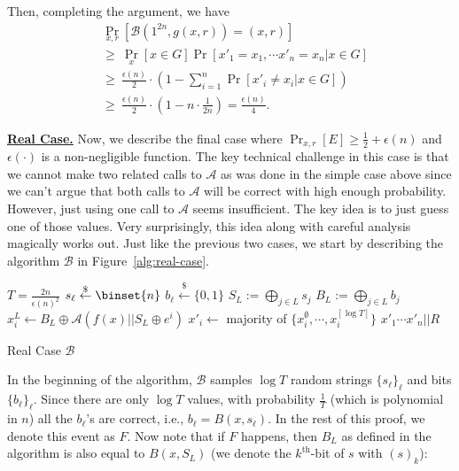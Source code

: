 \documentclass[12pt]{tufte-book}
\newcommand{\ma}{\mathcal{A}}
\begin{document}
Then, completing the argument, we have
\begin{align*}
&\Pr_{x,r}[\mathcal{B}(1^{2n}, g(x,r)) = (x,r)]\\
&\geq~ \Pr_x [x \in G] \Pr[x'_1 = x_1, \cdots x'_n = x_n | x \in G]\\
&\geq~ \frac{\epsilon(n)}{2} \cdot \left(1- \sum_{i=1}^n\Pr[x'_i \neq x_i | x \in G]\right)\\
&\geq~ \frac{\epsilon(n)}{2} \cdot \left(1- n \cdot\frac{1}{2n} \right) =  \frac{\epsilon(n)}{4}.
\end{align*}



\bigskip
\noindent\textbf{\underline{Real Case.}} Now, we describe the final case where $\Pr_{x,r}[E] \geq \frac{1}{2} + \epsilon(n)$ and $\epsilon(\cdot)$ is a non-negligible function.
The key technical challenge in this case is that we cannot make two related calls to $\ma$ as was done in the simple case above since we can't argue that both calls to $\ma$ will be correct with high enough probability.
However, just using one call to $\ma$ seems insufficient.
The key idea is to just guess one of those values.
Very surprisingly, this idea along with careful analysis magically works out.
Just like the previous two cases, we start by describing the algorithm $\mathcal{B}$ in Figure~\ref{alg:real-case}.


\begin{marginfigure}
\begin{algorithmic}
\State $T = \frac{2n}{\epsilon(n)^2}$
		\State $s_\ell \stackrel{\$}{\leftarrow} \binset{n}$
		\State $b_\ell \stackrel{\$}{\leftarrow} \{0,1\}$
	\EndFor
{}
		\State $S_L :=\bigoplus_{j \in L} s_j$
		\State $B_L := \bigoplus_{j \in L} b_j$
		\State $x_i^L \leftarrow B_L \oplus \ma(f(x) || S_L\oplus e^i)$
	\EndFor
	\State $x'_i \gets $ majority of $\{x_i^\emptyset, \cdots, x_i^{[\log T]}\}$
\EndFor
\State \Return $x'_1\cdots x'_n||R$
\end{algorithmic}
\caption{Real Case $\mathcal{B}$} \label{alg:real-case}
\end{marginfigure}

\medskip
In the beginning of the algorithm, $\mathcal{B}$ samples $\log T$ random strings $\{ s_\ell \}_{\ell}$ and bits $\{ b_\ell \}_{\ell}$.
Since there are only $\log T$ values, with probability $\frac{1}{T}$ (which is polynomial in $n$) all the $b_{\ell}$'s are correct, i.e., $b_\ell = B(x, s_\ell)$. In the rest of this proof, we denote this event as $F$.
Now note that if $F$ happens, then $B_L$ as defined in the algorithm is also equal to $B(x, S_L)$ (we denote the $k^{\text{th}}$-bit of $s$ with $(s)_k$): 
\end{document}
